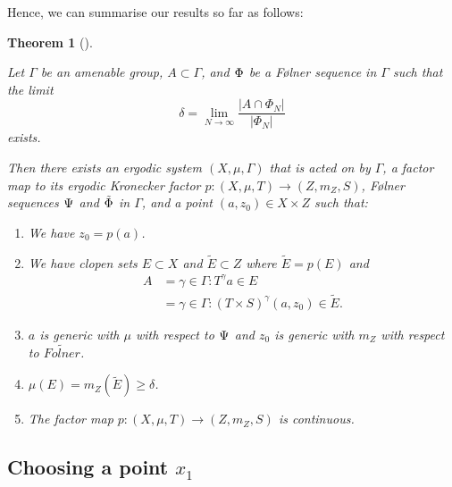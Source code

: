 \documentclass[
  british,
]{article}
\providecommand{\tightlist}{%
  \setlength{\itemsep}{0pt}\setlength{\parskip}{0pt}}
\theoremstyle{definition}
\theoremstyle{plain}
\theoremstyle{plain}
\newtheorem{theorem}{Theorem}[section]
\theoremstyle{plain}
\theoremstyle{remark}
\newcommand{\AmenableGroup}{{\Gamma}}
\newcommand{\AmenableGroupElement}{{\gamma}}
\newcommand{\CountingMeasure}[1]{{\left|#1\right|}}
\newcommand{\Folner}[1][\vphantom{}]{{\Phi}_{#1}}
\newcommand{\FurstenbergFolner}[1][{\vphantom{}}]{{\Psi}_{#1}}
\newcommand{\GroupAction}[2]{T^{#1}{#2}}
\newcommand{\KroneckerFactorMap}{p}
\newcommand{\KroneckerMeasure}{{m_Z}}
\newcommand{\KroneckerProductAction}[2]{(T\times S)^{#1}{#2}}
\newcommand{\KroneckerSpace}{{Z}}
\newcommand{\KroneckerSpaceElement}{{z}}
\newcommand{\Measure}{{\mu}}
\newcommand{\ShiftSpace}{{X}}
\newcommand{\FurstenbergSystem}{(\ShiftSpace,\Measure,T)}
\newcommand{\KroneckerFactor}{{(\KroneckerSpace,\KroneckerMeasure,S)}}
\begin{document}
Hence, we can summarise our results so far as follows:

\begin{theorem}[]\protect\hypertarget{thm-FCPKroneckerThm}{}\label{thm-FCPKroneckerThm}

Let \(\AmenableGroup\) be an amenable group,
\(A\subset \AmenableGroup\), and \(\Folner\) be a Følner sequence in
\(\AmenableGroup\) such that the limit
\[\delta=\lim_{N\rightarrow\infty}\frac{\CountingMeasure{A\cap\Folner[N]}}{\CountingMeasure{\Folner[N]}}\]
exists.

Then there exists an ergodic system
\((\ShiftSpace,\Measure,\AmenableGroup)\) that is acted on by
\(\AmenableGroup\), a factor map to its ergodic Kronecker factor
\(\KroneckerFactorMap: \FurstenbergSystem\rightarrow\KroneckerFactor\),
Følner sequences \(\FurstenbergFolner\) and \(\tilde{\Folner}\) in
\(\AmenableGroup\), and a point
\((a,\KroneckerSpaceElement_0)\in\ShiftSpace\times\KroneckerSpace\) such
that:

\begin{enumerate}
\def\labelenumi{\arabic{enumi}.}
\tightlist
\item
  We have \(\KroneckerSpaceElement_0=\KroneckerFactorMap(a)\).
\item
  We have clopen sets \(E\subset\ShiftSpace\) and
  \(\tilde{E}\subset\KroneckerSpace\) where
  \(\tilde{E}=\KroneckerFactorMap(E)\) and
  \begin{align*}   A&={\AmenableGroupElement\in \AmenableGroup:\GroupAction{\AmenableGroupElement}{a}\in E}   \\&={\AmenableGroupElement\in \AmenableGroup:\KroneckerProductAction{\AmenableGroupElement}{(a,\KroneckerSpaceElement_0)}\in \tilde{E}}. \end{align*}
\item
  \(a\) is generic with \(\Measure\) with respect to
  \(\FurstenbergFolner\) and \(\KroneckerSpaceElement_0\) is generic
  with \(\KroneckerMeasure\) with respect to \(\tilde{Folner}\).
\item
  \(\Measure(E)=\KroneckerMeasure(\tilde{E})\geq\delta\).
\item
  The factor map
  \(\KroneckerFactorMap: \FurstenbergSystem\rightarrow\KroneckerFactor\)
  is continuous.
\end{enumerate}

\end{theorem}

\subsection{\texorpdfstring{Choosing a point
\(x_1\)}{Choosing a point x\_1}}\label{choosing-a-point-x_1}
\end{document}
